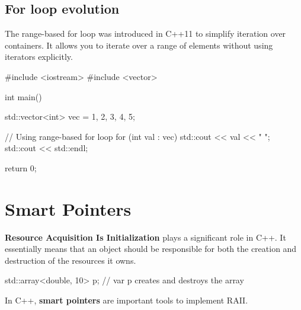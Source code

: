 \subsection*{For loop evolution}

The range-based for loop was introduced in C++11 to simplify iteration over containers. It allows you to iterate over a range of elements without using iterators explicitly.

\begin{exampleblock}
\begin{codeblock}[language=C++]
#include <iostream>
#include <vector>

int main() {
    std::vector<int> vec = {1, 2, 3, 4, 5};

    // Using range-based for loop
    for (int val : vec) {
        std::cout << val << " ";
    }
    std::cout << std::endl;

    return 0;
}
\end{codeblock}
\end{exampleblock}






\newpage
\section{Smart Pointers}

\begin{definitionblock}[RAII]
    \textbf{Resource Acquisition Is Initialization} plays a significant role in C++. It essentially means that an object should be responsible for both the creation and destruction of the resources it owns.
\end{definitionblock}

\begin{exampleblock}
    \begin{codeblock}[language=C++]
std::array<double, 10> p;  // var p creates and destroys the array
    \end{codeblock}
\end{exampleblock}

In C++, \textbf{smart pointers} are important tools to implement RAII.


